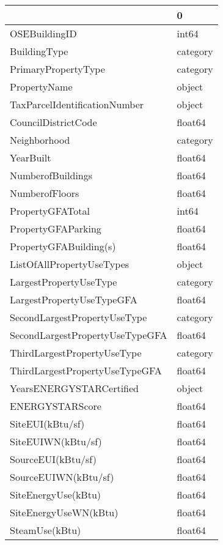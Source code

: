 \begin{tabular}{ll}
\toprule
{} &         0 \\
\midrule
OSEBuildingID                   &     int64 \\
BuildingType                    &  category \\
PrimaryPropertyType             &  category \\
PropertyName                    &    object \\
TaxParcelIdentificationNumber   &    object \\
CouncilDistrictCode             &   float64 \\
Neighborhood                    &  category \\
YearBuilt                       &   float64 \\
NumberofBuildings               &   float64 \\
NumberofFloors                  &   float64 \\
PropertyGFATotal                &     int64 \\
PropertyGFAParking              &   float64 \\
PropertyGFABuilding(s)          &   float64 \\
ListOfAllPropertyUseTypes       &    object \\
LargestPropertyUseType          &  category \\
LargestPropertyUseTypeGFA       &   float64 \\
SecondLargestPropertyUseType    &  category \\
SecondLargestPropertyUseTypeGFA &   float64 \\
ThirdLargestPropertyUseType     &  category \\
ThirdLargestPropertyUseTypeGFA  &   float64 \\
YearsENERGYSTARCertified        &    object \\
ENERGYSTARScore                 &   float64 \\
SiteEUI(kBtu/sf)                &   float64 \\
SiteEUIWN(kBtu/sf)              &   float64 \\
SourceEUI(kBtu/sf)              &   float64 \\
SourceEUIWN(kBtu/sf)            &   float64 \\
SiteEnergyUse(kBtu)             &   float64 \\
SiteEnergyUseWN(kBtu)           &   float64 \\
SteamUse(kBtu)                  &   float64 \\

\end{tabular}
